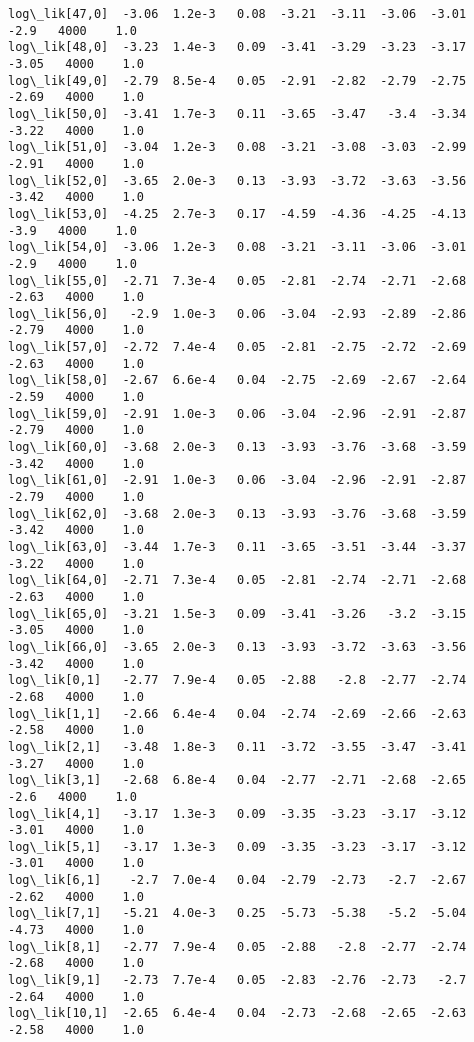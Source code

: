 \documentclass[11pt]{article}
\begin{document}
\begin{Verbatim}[commandchars=\\\{\}]
log\_lik[47,0]  -3.06  1.2e-3   0.08  -3.21  -3.11  -3.06  -3.01   -2.9   4000    1.0
log\_lik[48,0]  -3.23  1.4e-3   0.09  -3.41  -3.29  -3.23  -3.17  -3.05   4000    1.0
log\_lik[49,0]  -2.79  8.5e-4   0.05  -2.91  -2.82  -2.79  -2.75  -2.69   4000    1.0
log\_lik[50,0]  -3.41  1.7e-3   0.11  -3.65  -3.47   -3.4  -3.34  -3.22   4000    1.0
log\_lik[51,0]  -3.04  1.2e-3   0.08  -3.21  -3.08  -3.03  -2.99  -2.91   4000    1.0
log\_lik[52,0]  -3.65  2.0e-3   0.13  -3.93  -3.72  -3.63  -3.56  -3.42   4000    1.0
log\_lik[53,0]  -4.25  2.7e-3   0.17  -4.59  -4.36  -4.25  -4.13   -3.9   4000    1.0
log\_lik[54,0]  -3.06  1.2e-3   0.08  -3.21  -3.11  -3.06  -3.01   -2.9   4000    1.0
log\_lik[55,0]  -2.71  7.3e-4   0.05  -2.81  -2.74  -2.71  -2.68  -2.63   4000    1.0
log\_lik[56,0]   -2.9  1.0e-3   0.06  -3.04  -2.93  -2.89  -2.86  -2.79   4000    1.0
log\_lik[57,0]  -2.72  7.4e-4   0.05  -2.81  -2.75  -2.72  -2.69  -2.63   4000    1.0
log\_lik[58,0]  -2.67  6.6e-4   0.04  -2.75  -2.69  -2.67  -2.64  -2.59   4000    1.0
log\_lik[59,0]  -2.91  1.0e-3   0.06  -3.04  -2.96  -2.91  -2.87  -2.79   4000    1.0
log\_lik[60,0]  -3.68  2.0e-3   0.13  -3.93  -3.76  -3.68  -3.59  -3.42   4000    1.0
log\_lik[61,0]  -2.91  1.0e-3   0.06  -3.04  -2.96  -2.91  -2.87  -2.79   4000    1.0
log\_lik[62,0]  -3.68  2.0e-3   0.13  -3.93  -3.76  -3.68  -3.59  -3.42   4000    1.0
log\_lik[63,0]  -3.44  1.7e-3   0.11  -3.65  -3.51  -3.44  -3.37  -3.22   4000    1.0
log\_lik[64,0]  -2.71  7.3e-4   0.05  -2.81  -2.74  -2.71  -2.68  -2.63   4000    1.0
log\_lik[65,0]  -3.21  1.5e-3   0.09  -3.41  -3.26   -3.2  -3.15  -3.05   4000    1.0
log\_lik[66,0]  -3.65  2.0e-3   0.13  -3.93  -3.72  -3.63  -3.56  -3.42   4000    1.0
log\_lik[0,1]   -2.77  7.9e-4   0.05  -2.88   -2.8  -2.77  -2.74  -2.68   4000    1.0
log\_lik[1,1]   -2.66  6.4e-4   0.04  -2.74  -2.69  -2.66  -2.63  -2.58   4000    1.0
log\_lik[2,1]   -3.48  1.8e-3   0.11  -3.72  -3.55  -3.47  -3.41  -3.27   4000    1.0
log\_lik[3,1]   -2.68  6.8e-4   0.04  -2.77  -2.71  -2.68  -2.65   -2.6   4000    1.0
log\_lik[4,1]   -3.17  1.3e-3   0.09  -3.35  -3.23  -3.17  -3.12  -3.01   4000    1.0
log\_lik[5,1]   -3.17  1.3e-3   0.09  -3.35  -3.23  -3.17  -3.12  -3.01   4000    1.0
log\_lik[6,1]    -2.7  7.0e-4   0.04  -2.79  -2.73   -2.7  -2.67  -2.62   4000    1.0
log\_lik[7,1]   -5.21  4.0e-3   0.25  -5.73  -5.38   -5.2  -5.04  -4.73   4000    1.0
log\_lik[8,1]   -2.77  7.9e-4   0.05  -2.88   -2.8  -2.77  -2.74  -2.68   4000    1.0
log\_lik[9,1]   -2.73  7.7e-4   0.05  -2.83  -2.76  -2.73   -2.7  -2.64   4000    1.0
log\_lik[10,1]  -2.65  6.4e-4   0.04  -2.73  -2.68  -2.65  -2.63  -2.58   4000    1.0

\end{Verbatim}
\end{document}

